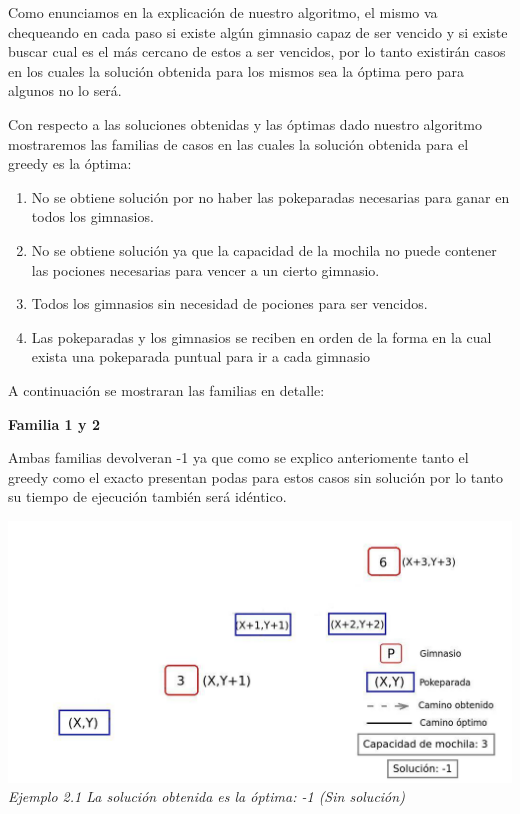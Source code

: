 Como enunciamos en la explicaci\'on de nuestro algoritmo, el mismo va chequeando en cada paso si existe alg\'un gimnasio capaz de ser vencido y si existe buscar cual es el m\'as cercano de estos a ser vencidos, por lo tanto existir\'an casos en los cuales la soluci\'on obtenida para los mismos sea la \'optima pero para algunos no lo ser\'a.

Con respecto a las soluciones obtenidas y las \'optimas dado nuestro algoritmo mostraremos las familias de casos en las cuales la soluci\'on obtenida para el greedy es la \'optima:

\begin{enumerate}
\item No se obtiene soluci\'on por no haber las pokeparadas necesarias para ganar en todos los gimnasios.
\item No se obtiene soluci\'on ya que la capacidad de la mochila no puede contener las pociones necesarias para vencer a un cierto gimnasio.
\item Todos los gimnasios sin necesidad de pociones para ser vencidos.
\item Las pokeparadas y los gimnasios se reciben en orden de la forma en la cual exista una pokeparada puntual para ir a cada gimnasio
\end{enumerate}

A continuaci\'on se mostraran las familias en detalle:\\

\begin{center}
\textbf{Familia 1 y 2}
\end{center}

Ambas familias devolveran -1 ya que como se explico anteriomente tanto el greedy como el exacto presentan podas para estos casos sin soluci\'on por lo tanto su tiempo de ejecuci\'on tambi\'en ser\'a id\'entico.

\vspace*{0.3cm} \vspace*{0.3cm}
  \begin{center}
\includegraphics[scale=0.60]{./EJ2/sinSolucion.jpeg}
\\{\textit{Ejemplo 2.1 La soluci\'on obtenida es la \'optima: -1 (Sin soluci\'on)}}
  \end{center}
  \vspace*{0.3cm}
  
